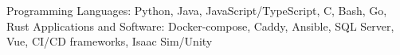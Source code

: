 
\begin{cvskills}
  \cvskill
    {Programming Languages:} %
    {Python, Java, JavaScript/TypeScript, C, Bash, Go, Rust} %
  \cvskill
    {Applications and Software:} %
    {Docker-compose, Caddy, Ansible, SQL Server, Vue, CI/CD frameworks, Isaac Sim/Unity} %
\end{cvskills}
